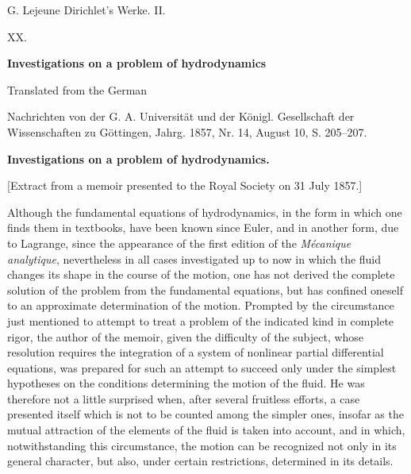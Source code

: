 \documentclass[11pt]{article}
\begin{document}
\begin{center}
{\Large G. Lejeune Dirichlet's Werke. II.}\par\vspace{1.2em}
{\Large XX.}\par\vspace{0.5em}
{\LARGE \textbf{Investigations on a problem of hydrodynamics}}\par\vspace{1em}
{\large Translated from the German}\par\vspace{0.5em}
{\small Nachrichten von der G. A. Universität und der Königl. Gesellschaft der Wissenschaften zu Göttingen, Jahrg. 1857, Nr. 14, August 10, S. 205--207.}
\end{center}

\bigskip
\begin{center}
{\large \textbf{Investigations on a problem of hydrodynamics.}}
\end{center}

\begin{center}
[Extract from a memoir presented to the Royal Society on 31 July 1857.]
\end{center}

Although the fundamental equations of hydrodynamics, in the form in which one finds them in textbooks, have been known since Euler, and in another form, due to Lagrange, since the appearance of the first edition of the \emph{Mécanique analytique}, nevertheless in all cases investigated up to now in which the fluid changes its shape in the course of the motion, one has not derived the complete solution of the problem from the fundamental equations, but has confined oneself to an approximate determination of the motion. Prompted by the circumstance just mentioned to attempt to treat a problem of the indicated kind in complete rigor, the author of the memoir, given the difficulty of the subject, whose resolution requires the integration of a system of nonlinear partial differential equations, was prepared for such an attempt to succeed only under the simplest hypotheses on the conditions determining the motion of the fluid. He was therefore not a little surprised when, after several fruitless efforts, a case presented itself which is not to be counted among the simpler ones, insofar as the mutual attraction of the elements of the fluid is taken into account, and in which, notwithstanding this circumstance, the motion can be recognized not only in its general character, but also, under certain restrictions, determined in its details.
\end{document}
